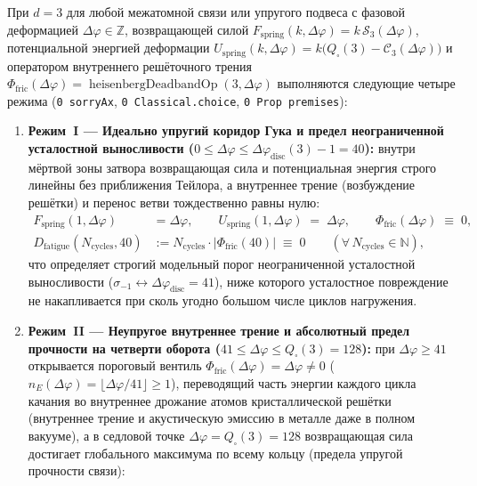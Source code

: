 \begin{theorem}[Четыре режима упругости пружины, предел неограниченной выносливости $\Delta\varphi_{\mathrm{disc}}(3)=41$, дислокационный скачок Бюргерса на противофазном потолке $\Phi_{\mathrm{Pauli}}(3)=256$ и связанный упругий маятник на произвольных углах, \texttt{MechanicsElasticity.lean}]
\label{thm:mono-mechanics-elasticity-four-regimes}
При $d = 3$ для любой межатомной связи или упругого подвеса с фазовой деформацией $\Delta\varphi \in \mathbb{Z}$, возвращающей силой $F_{\mathrm{spring}}(k, \Delta\varphi) = k\,\mathcal{S}_3(\Delta\varphi)$, потенциальной энергией деформации $U_{\mathrm{spring}}(k, \Delta\varphi) = k\bigl(Q_\square(3) - \mathcal{C}_3(\Delta\varphi)\bigr)$ и оператором внутреннего решёточного трения $\Phi_{\mathrm{fric}}(\Delta\varphi) = \operatorname{heisenbergDeadbandOp}(3, \Delta\varphi)$ выполняются следующие четыре режима (\texttt{0 sorryAx}, \texttt{0 Classical.choice}, \texttt{0 Prop premises}):
\begin{enumerate}[label=\textbf{(\arabic*)},leftmargin=*]
\item \textbf{Режим~I --- Идеально упругий коридор Гука и предел неограниченной усталостной выносливости ($0 \le \Delta\varphi \le \Delta\varphi_{\mathrm{disc}}(3) - 1 = 40$):}
  внутри мёртвой зоны затвора возвращающая сила и потенциальная энергия строго линейны без приближения Тейлора, а внутреннее трение (возбуждение решётки) и перенос ветви тождественно равны нулю:
  \begin{align}
    F_{\mathrm{spring}}(1, \Delta\varphi) &= \Delta\varphi, \qquad
    U_{\mathrm{spring}}(1, \Delta\varphi) \;=\; \Delta\varphi, \qquad
    \Phi_{\mathrm{fric}}(\Delta\varphi) \;\equiv\; 0, \label{eq:mono-hooke-lossless} \\
    D_{\mathrm{fatigue}}(N_{\mathrm{cycles}}, 40) &:= N_{\mathrm{cycles}}\cdot|\Phi_{\mathrm{fric}}(40)| \;\equiv\; 0 \qquad (\forall\,N_{\mathrm{cycles}} \in \mathbb{N}), \label{eq:mono-infinite-fatigue-endurance}
  \end{align}
  что определяет строгий модельный порог неограниченной усталостной выносливости ($\sigma_{-1} \leftrightarrow \Delta\varphi_{\mathrm{disc}} = 41$), ниже которого усталостное повреждение не накапливается при сколь угодно большом числе циклов нагружения.
\item \textbf{Режим~II --- Неупругое внутреннее трение и абсолютный предел прочности на четверти оборота ($41 \le \Delta\varphi \le Q_\square(3) = 128$):}
  при $\Delta\varphi \ge 41$ открывается пороговый вентиль $\Phi_{\mathrm{fric}}(\Delta\varphi) = \Delta\varphi \ne 0$ ($\hat{n}_E(\Delta\varphi) = \lfloor\Delta\varphi/41\rfloor \ge 1$), переводящий часть энергии каждого цикла качания во внутреннее дрожание атомов кристаллической решётки (внутреннее трение и акустическую эмиссию в металле даже в полном вакууме), а в седловой точке $\Delta\varphi = Q_\square(3) = 128$ возвращающая сила достигает глобального максимума по всему кольцу (предела упругой прочности связи):

\end{enumerate}
\end{theorem}

